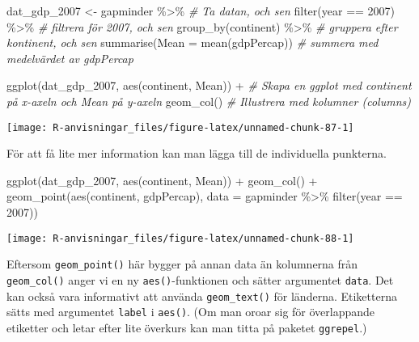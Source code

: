 \documentclass[
]{book}
\newenvironment{Shaded}{\begin{snugshade}}{\end{snugshade}}
\newcommand{\AttributeTok}[1]{\textcolor[rgb]{0.77,0.63,0.00}{#1}}
\newcommand{\CommentTok}[1]{\textcolor[rgb]{0.56,0.35,0.01}{\textit{#1}}}
\newcommand{\DecValTok}[1]{\textcolor[rgb]{0.00,0.00,0.81}{#1}}
\newcommand{\FunctionTok}[1]{\textcolor[rgb]{0.00,0.00,0.00}{#1}}
\newcommand{\NormalTok}[1]{#1}
\newcommand{\OtherTok}[1]{\textcolor[rgb]{0.56,0.35,0.01}{#1}}
\newcommand{\SpecialCharTok}[1]{\textcolor[rgb]{0.00,0.00,0.00}{#1}}
\theoremstyle{definition}
\theoremstyle{definition}
\theoremstyle{definition}
\theoremstyle{definition}
\theoremstyle{remark}
\begin{document}
\begin{Shaded}
\begin{Highlighting}[]
\NormalTok{dat\_gdp\_2007 }\OtherTok{\textless{}{-}}\NormalTok{ gapminder }\SpecialCharTok{\%\textgreater{}\%}                    \CommentTok{\# Ta datan, och sen}
  \FunctionTok{filter}\NormalTok{(year }\SpecialCharTok{==} \DecValTok{2007}\NormalTok{) }\SpecialCharTok{\%\textgreater{}\%}                       \CommentTok{\# filtrera för 2007, och sen}
  \FunctionTok{group\_by}\NormalTok{(continent) }\SpecialCharTok{\%\textgreater{}\%}                        \CommentTok{\# gruppera efter kontinent, och sen}
  \FunctionTok{summarise}\NormalTok{(}\AttributeTok{Mean =} \FunctionTok{mean}\NormalTok{(gdpPercap))              }\CommentTok{\# summera med medelvärdet av gdpPercap}

\FunctionTok{ggplot}\NormalTok{(dat\_gdp\_2007, }\FunctionTok{aes}\NormalTok{(continent, Mean)) }\SpecialCharTok{+}     \CommentTok{\# Skapa en ggplot med continent på x{-}axeln och Mean på y{-}axeln}
  \FunctionTok{geom\_col}\NormalTok{()                                     }\CommentTok{\# Illustrera med kolumner (columns)}
\end{Highlighting}
\end{Shaded}

\begin{center}\texttt{[image: R-anvisningar\_files/figure-latex/unnamed-chunk-87-1]} \end{center}

För att få lite mer information kan man lägga till de individuella punkterna.

\begin{Shaded}
\begin{Highlighting}[]
\FunctionTok{ggplot}\NormalTok{(dat\_gdp\_2007, }\FunctionTok{aes}\NormalTok{(continent, Mean)) }\SpecialCharTok{+}
  \FunctionTok{geom\_col}\NormalTok{() }\SpecialCharTok{+}
  \FunctionTok{geom\_point}\NormalTok{(}\FunctionTok{aes}\NormalTok{(continent, gdpPercap), }\AttributeTok{data =}\NormalTok{ gapminder }\SpecialCharTok{\%\textgreater{}\%} \FunctionTok{filter}\NormalTok{(year }\SpecialCharTok{==} \DecValTok{2007}\NormalTok{))}
\end{Highlighting}
\end{Shaded}

\begin{center}\texttt{[image: R-anvisningar\_files/figure-latex/unnamed-chunk-88-1]} \end{center}

Eftersom \texttt{geom\_point()} här bygger på annan data än kolumnerna från \texttt{geom\_col()} anger vi en ny \texttt{aes()}-funktionen och sätter argumentet \texttt{data}. Det kan också vara informativt att använda \texttt{geom\_text()} för länderna. Etiketterna sätts med argumentet \texttt{label} i \texttt{aes()}. (Om man oroar sig för överlappande etiketter och letar efter lite överkurs kan man titta på paketet \texttt{ggrepel}.)
\end{document}
